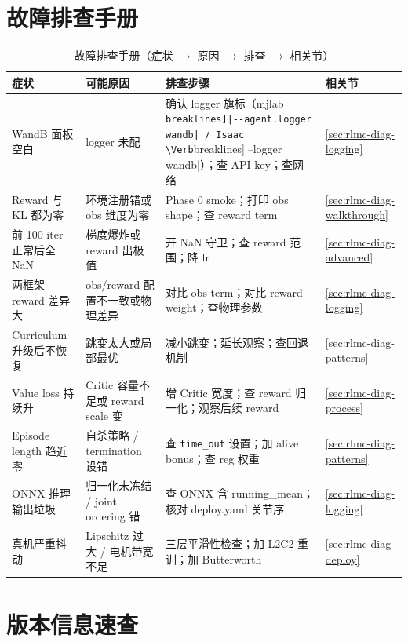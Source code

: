 \section*{故障排查手册}
\label{sec:rlmc-diag-troubleshoot}

\begin{table}[H]
\centering
\caption{故障排查手册（症状 $\to$ 原因 $\to$ 排查 $\to$ 相关节）}
\label{tab:rlmc-diag-troubleshoot}
\begin{tabular}{p{3.0cm}p{3.2cm}p{4.2cm}p{2.0cm}}
\hline
症状 & 可能原因 & 排查步骤 & 相关节 \\
\hline
WandB 面板空白 & logger 未配 & 确认 logger 旗标（mjlab \Verb[breaklines]|--agent.logger wandb| / Isaac \Verb[breaklines]|--logger wandb|）；查 API key；查网络 & \cref{sec:rlmc-diag-logging} \\
Reward 与 KL 都为零 & 环境注册错或 obs 维度为零 & Phase 0 smoke；打印 obs shape；查 reward term & \cref{sec:rlmc-diag-walkthrough} \\
前 100 iter 正常后全 NaN & 梯度爆炸或 reward 出极值 & 开 NaN 守卫；查 reward 范围；降 lr & \cref{sec:rlmc-diag-advanced} \\
两框架 reward 差异大 & obs/reward 配置不一致或物理差异 & 对比 obs term；对比 reward weight；查物理参数 & \cref{sec:rlmc-diag-logging} \\
Curriculum 升级后不恢复 & 跳变太大或局部最优 & 减小跳变；延长观察；查回退机制 & \cref{sec:rlmc-diag-patterns} \\
Value loss 持续升 & Critic 容量不足或 reward scale 变 & 增 Critic 宽度；查 reward 归一化；观察后续 reward & \cref{sec:rlmc-diag-process} \\
Episode length 趋近零 & 自杀策略 / termination 设错 & 查 \verb|time_out| 设置；加 alive bonus；查 reg 权重 & \cref{sec:rlmc-diag-patterns} \\
ONNX 推理输出垃圾 & 归一化未冻结 / joint ordering 错 & 查 ONNX 含 running\_mean；核对 deploy.yaml 关节序 & \cref{sec:rlmc-diag-logging} \\
真机严重抖动 & Lipschitz 过大 / 电机带宽不足 & 三层平滑性检查；加 L2C2 重训；加 Butterworth & \cref{sec:rlmc-diag-deploy} \\
\hline
\end{tabular}
\end{table}

\section*{版本信息速查}
\label{sec:rlmc-diag-versioninfo}

